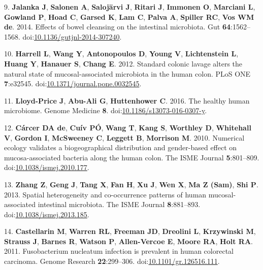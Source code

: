 \documentclass[11pt,]{article}
\begin{document}
\hypertarget{ref-Jalanka2014}{}
9. \textbf{Jalanka J}, \textbf{Salonen A}, \textbf{Salojärvi J},
\textbf{Ritari J}, \textbf{Immonen O}, \textbf{Marciani L},
\textbf{Gowland P}, \textbf{Hoad C}, \textbf{Garsed K}, \textbf{Lam C},
\textbf{Palva A}, \textbf{Spiller RC}, \textbf{Vos WM de}. 2014. Effects
of bowel cleansing on the intestinal microbiota. Gut
\textbf{64}:1562--1568.
doi:\href{https://doi.org/10.1136/gutjnl-2014-307240}{10.1136/gutjnl-2014-307240}.

\hypertarget{ref-Harrell2012}{}
10. \textbf{Harrell L}, \textbf{Wang Y}, \textbf{Antonopoulos D},
\textbf{Young V}, \textbf{Lichtenstein L}, \textbf{Huang Y},
\textbf{Hanauer S}, \textbf{Chang E}. 2012. Standard colonic lavage
alters the natural state of mucosal-associated microbiota in the human
colon. PLoS ONE \textbf{7}:e32545.
doi:\href{https://doi.org/10.1371/journal.pone.0032545}{10.1371/journal.pone.0032545}.

\hypertarget{ref-LloydPrice2016}{}
11. \textbf{Lloyd-Price J}, \textbf{Abu-Ali G}, \textbf{Huttenhower C}.
2016. The healthy human microbiome. Genome Medicine \textbf{8}.
doi:\href{https://doi.org/10.1186/s13073-016-0307-y}{10.1186/s13073-016-0307-y}.

\hypertarget{ref-deCarcer2010}{}
12. \textbf{Cárcer DA de}, \textbf{Cuív PÓ}, \textbf{Wang T},
\textbf{Kang S}, \textbf{Worthley D}, \textbf{Whitehall V},
\textbf{Gordon I}, \textbf{McSweeney C}, \textbf{Leggett B},
\textbf{Morrison M}. 2010. Numerical ecology validates a biogeographical
distribution and gender-based effect on mucosa-associated bacteria along
the human colon. The ISME Journal \textbf{5}:801--809.
doi:\href{https://doi.org/10.1038/ismej.2010.177}{10.1038/ismej.2010.177}.

\hypertarget{ref-Zhang2013}{}
13. \textbf{Zhang Z}, \textbf{Geng J}, \textbf{Tang X}, \textbf{Fan H},
\textbf{Xu J}, \textbf{Wen X}, \textbf{Ma Z (Sam)}, \textbf{Shi P}.
2013. Spatial heterogeneity and co-occurrence patterns of human
mucosal-associated intestinal microbiota. The ISME Journal
\textbf{8}:881--893.
doi:\href{https://doi.org/10.1038/ismej.2013.185}{10.1038/ismej.2013.185}.

\hypertarget{ref-Castellarin2011}{}
14. \textbf{Castellarin M}, \textbf{Warren RL}, \textbf{Freeman JD},
\textbf{Dreolini L}, \textbf{Krzywinski M}, \textbf{Strauss J},
\textbf{Barnes R}, \textbf{Watson P}, \textbf{Allen-Vercoe E},
\textbf{Moore RA}, \textbf{Holt RA}. 2011. Fusobacterium nucleatum
infection is prevalent in human colorectal carcinoma. Genome Research
\textbf{22}:299--306.
doi:\href{https://doi.org/10.1101/gr.126516.111}{10.1101/gr.126516.111}.
\end{document}
